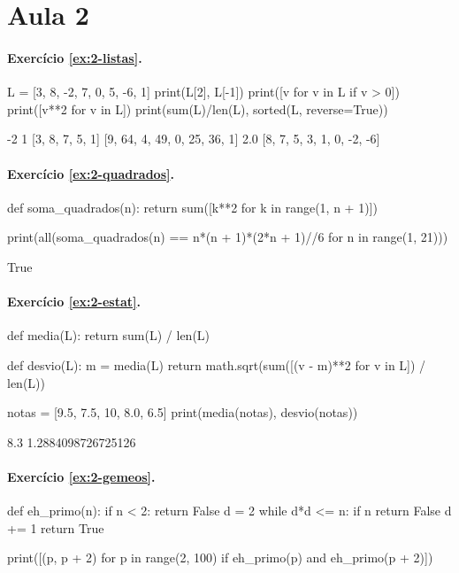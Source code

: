 \section*{Aula 2}

\paragraph{Exercício \ref{ex:2-listas}.}
\begin{entrada}
L = [3, 8, -2, 7, 0, 5, -6, 1]
print(L[2], L[-1])
print([v for v in L if v > 0])
print([v**2 for v in L])
print(sum(L)/len(L), sorted(L, reverse=True))
\end{entrada}
\begin{saida}
-2 1
[3, 8, 7, 5, 1]
[9, 64, 4, 49, 0, 25, 36, 1]
2.0 [8, 7, 5, 3, 1, 0, -2, -6]
\end{saida}

\paragraph{Exercício \ref{ex:2-quadrados}.}
\begin{entrada}
def soma_quadrados(n):
    return sum([k**2 for k in range(1, n + 1)])

print(all(soma_quadrados(n) == n*(n + 1)*(2*n + 1)//6 for n in range(1, 21)))
\end{entrada}
\begin{saida}
True
\end{saida}

\paragraph{Exercício \ref{ex:2-estat}.}
\begin{entrada}
def media(L):
    return sum(L) / len(L)

def desvio(L):
    m = media(L)
    return math.sqrt(sum([(v - m)**2 for v in L]) / len(L))

notas = [9.5, 7.5, 10, 8.0, 6.5]
print(media(notas), desvio(notas))
\end{entrada}
\begin{saida}
8.3 1.2884098726725126
\end{saida}

\paragraph{Exercício \ref{ex:2-gemeos}.}
\begin{entrada}
def eh_primo(n):
    if n < 2:
        return False
    d = 2
    while d*d <= n:
        if n %
            return False
        d += 1
    return True

print([(p, p + 2) for p in range(2, 100) if eh_primo(p) and eh_primo(p + 2)])
\end{entrada}
\begin{saida}
[(3, 5), (5, 7), (11, 13), (17, 19), (29, 31), (41, 43), (59, 61), (71, 73)]
\end{saida}

